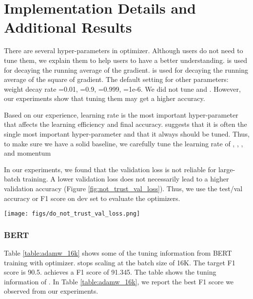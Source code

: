 \documentclass{article} \usepackage{iclr2020_conference,times}
\begin{document}
\section{Implementation Details and Additional Results}

There are several hyper-parameters in  optimizer. 
Although users do not need to tune them, we explain them to help users to have a better understanding.
 is used for decaying the running average of the gradient.
 is used for decaying the running average of the square of gradient.
The default setting for other parameters: weight decay rate =0.01, =0.9, =0.999, =1e-6.
We did not tune  and .
However, our experiments show that tuning them may get a higher accuracy.

Based on our experience, learning rate is the most important hyper-parameter that affects the learning efficiency and final accuracy.
\cite{bengio2012practical} suggests that it is often the single most important hyper-parameter and that it always should be tuned.
Thus, to make sure we have a solid baseline, we carefully tune the learning rate of , , , and momentum 

In our experiments, we found that the validation loss is not reliable for large-batch training. A lower validation loss does not necessarily lead to a higher validation accuracy (Figure \ref{fig:not_trust_val_loss}).
Thus, we use the test/val accuracy or F1 score on dev set to evaluate the optimizers.





\begin{figure*}[tb]
\vspace{5pt}
\centering
\texttt{[image: figs/do\_not\_trust\_val\_loss.png]}
\caption{Our experiments show that even the validation loss is not reliable in the large-scale training. A lower validation loss may lead to a worse accuracy. Thus, we use the test/val accuracy or F1 score on dev set to evaluate the optimizers.}
\label{fig:not_trust_val_loss}
\vspace{-10pt}
\end{figure*}



\subsubsection{BERT}
Table \ref{table:adamw_16k} shows some of the tuning information from BERT training with  optimizer.
 stops scaling at the batch size of 16K. The target F1 score is 90.5.  achieves a F1 score of 91.345. The table shows the tuning information of . In Table \ref{table:adamw_16k}, we report the best F1 score we observed from our experiments.
\end{document}
